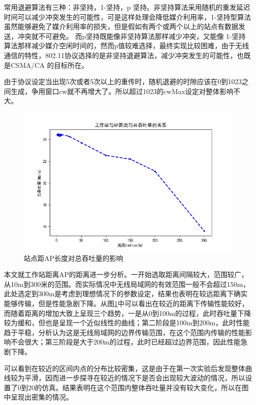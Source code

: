 \documentclass{article}
\begin{document}
常用退避算法有三种：非坚持，1-坚持，p 坚持。非坚持算法采用随机的重发延迟时间可以减少冲突发生的可能性，可是这样处理会降低媒介利用率，1-坚持型算法虽然能够避免了媒介利用率的损失，但是假如有两个或两个以上的站点有数据发送，冲突就不可避免。 而p坚持既能像非坚持算法那样减少冲突，又能像 1-坚持算法那样减少媒介空闲时间的，然而p值较难选择，最终实现比较困难，由于无线通信的特性，802.11协议选择的是非坚持退避算法，减少冲突发生的可能性，也既是CSMA/CA 的目标所在。

由于协议设定当出现5次或者5次以上的重传时，随机退避的时隙应该在0到1023之间生成，争用窗口cw就不再增大了。所以超过1023的cwMax设定对整体影响不大。

\begin{figure}[ht]
	\centering
	\includegraphics[scale=0.6]{picture/radius.png}
	\caption{站点距AP长度对总吞吐量的影响}
	\label{fig:radius}
\end{figure}

本文就工作站距离AP的距离进一步分析。一开始选取距离间隔较大，范围较广，从10m到300米的范围。而实际情况中无线局域网的有效范围一般不会超过150m，此处选定到300m是考虑到理想情况下的参数设定，结果也表明在较远距离下确实能够传输，但是性能急剧下降。从图\ref{fig:radius}中可以看出在较近的距离下传输性能较好，而随着距离的增加大致上呈现三个趋势，一是从0到100m的过程，此时吞吐量下降较为缓和，但也是呈现一个近似线性的曲线；第二阶段是100m到200m，此时性能趋于平稳，分析认为这是无线局域网的边界传输范围，在这个范围内传输的性能影响不会很大；第三阶段是大于200m的过程，此时已经超过边界范围，因此性能急剧下降。

可以看到在较近的区间内点的分布比较密集，这是由于在第一次实验后发现整体曲线较为平滑，因而进一步探寻在较近的情况下是否会出现较大波动的情况，所以设置了0到20的仿真。结果表明在这个范围内整体吞吐量并没有较大变化，所以在图中呈现出密集的情况。
\end{document}
